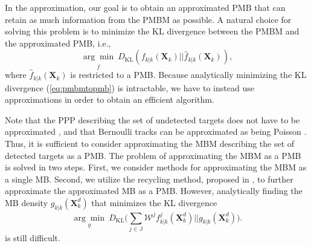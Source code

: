 \documentclass[journal]{IEEEtran}
\begin{document}
In the approximation, our goal is to obtain an approximated PMB that can retain as much information from the PMBM as possible. A natural choice for solving this problem is to minimize the KL divergence between the PMBM and the approximated PMB, i.e.,
\begin{equation}
    \underset{\hat{f}}{\arg\min}~D_{\text{KL}}(f_{k|k}(\mathbf{X}_k)||\hat{f}_{k|k}(\mathbf{X}_k)),
    \label{eq:pmbmtopmb}
\end{equation}
where $\hat{f}_{k|k}(\mathbf{X}_k)$ is restricted to a PMB. Because analytically minimizing the KL divergence (\ref{eq:pmbmtopmb}) is intractable, we have to instead use approximations in order to obtain an efficient algorithm. 


Note that the PPP describing the set of undetected targets does not have to be approximated \cite{pmbmpoint}, and that Bernoulli tracks can be approximated as being Poisson \cite{recycle}. Thus, it is sufficient to consider approximating the MBM describing the set of detected targets as a PMB. The problem of approximating the MBM as a PMB is solved in two steps. First, we consider methods for approximating the MBM as a single MB. Second, we utilize the recycling method, proposed in \cite{recycle}, to further approximate the approximated MB as a PMB. However, analytically finding the MB density $g_{k|k}(\mathbf{X}_k^d)$ that minimizes the KL divergence
\begin{equation}
    \underset{g}{\arg\min}~D_{\text{KL}}\bigg(\sum_{j\in\mathbb{J}}\mathcal{W}^jf_{k|k}^j(\mathbf{X}_k^d)||g_{k|k}(\mathbf{X}_k^d)\bigg).
    \label{eq:mbmtomb}
\end{equation}
is still difficult. 

\end{document}
